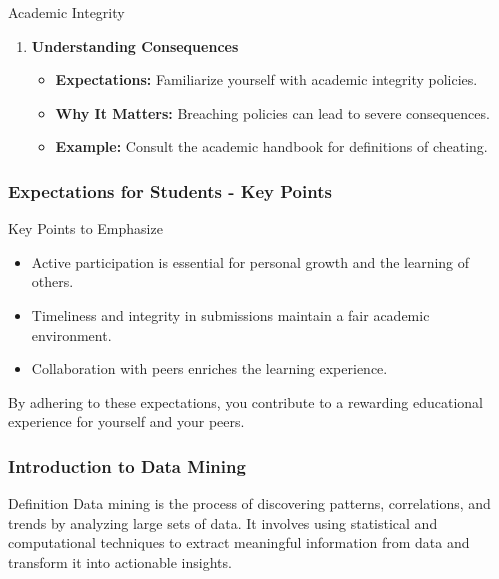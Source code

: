 \documentclass[aspectratio=169]{beamer}
\begin{document}
\begin{frame}[fragile]
\begin{block}{Academic Integrity}
\begin{enumerate}
            \item \textbf{Understanding Consequences}
            \begin{itemize}
                \item \textbf{Expectations:} Familiarize yourself with academic integrity policies.
                \item \textbf{Why It Matters:} Breaching policies can lead to severe consequences.
                \item \textbf{Example:} Consult the academic handbook for definitions of cheating.
            \end{itemize}
        \end{enumerate}
    \end{block}
\end{frame}

\begin{frame}[fragile]
    \frametitle{Expectations for Students - Key Points}
    \begin{block}{Key Points to Emphasize}
        \begin{itemize}
            \item Active participation is essential for personal growth and the learning of others.
            \item Timeliness and integrity in submissions maintain a fair academic environment.
            \item Collaboration with peers enriches the learning experience.
        \end{itemize}
        By adhering to these expectations, you contribute to a rewarding educational experience for yourself and your peers.
    \end{block}
\end{frame}

\begin{frame}[fragile]
    \frametitle{Introduction to Data Mining}
    \begin{block}{Definition}
        Data mining is the process of discovering patterns, correlations, and trends by analyzing large sets of data. It involves using statistical and computational techniques to extract meaningful information from data and transform it into actionable insights.
    \end{block}
\end{frame}
\end{document}
